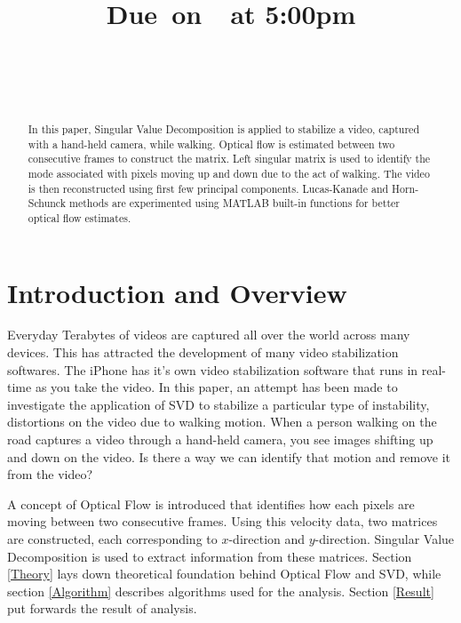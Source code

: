 \documentclass{article}
\title{
    \vspace{2in}
    \textmd{\textbf{\hmwkClass}}\\
    \vspace{0.3in}\textmd{\textbf{\hmwkTitle}}\\
    \normalsize\vspace{0.1in}\small{Due\ on\ \hmwkDueDate\ at 5:00pm}\\
    \vspace{0.1in}\large{\textit{\hmwkClassInstructor}} \\
    \vspace{0.1in}\large{{\hmwkClassSection}} \\
    \vspace{2.5in}
}
\author{\hmwkAuthorName}
\date{}
\begin{document}
\maketitle
\pagebreak

\begin{abstract}
In this paper, Singular Value Decomposition is applied to stabilize a video, captured with a hand-held camera, while walking. Optical flow is estimated between two consecutive frames to construct the matrix. Left singular matrix is used to identify the mode associated with pixels moving up and down due to the act of walking. The video is then reconstructed using first few principal components. Lucas-Kanade and Horn-Schunck methods are experimented using MATLAB built-in functions for better optical flow estimates.
\end{abstract}

\section{Introduction and Overview}
Everyday Terabytes of videos are captured all over the world across many devices. This has attracted the development of many video stabilization softwares. The iPhone has it's own video stabilization software that runs in real-time as you take the video. In this paper, an attempt has been made to investigate the application of SVD to stabilize a particular type of instability, distortions on the video due to walking motion. When a person walking on the road captures a video through a hand-held camera, you see images shifting up and down on the video. Is there a way we can identify that motion and remove it from the video?

A concept of Optical Flow is introduced that identifies how each pixels are moving between two consecutive frames. Using this velocity data, two matrices are constructed, each corresponding to $x$-direction and $y$-direction. Singular Value Decomposition is used to extract information from these matrices. Section \ref{Theory} lays down theoretical foundation behind Optical Flow and SVD, while section \ref{Algorithm} describes algorithms used for the analysis. Section \ref{Result} put forwards the result of analysis.

\end{document}
